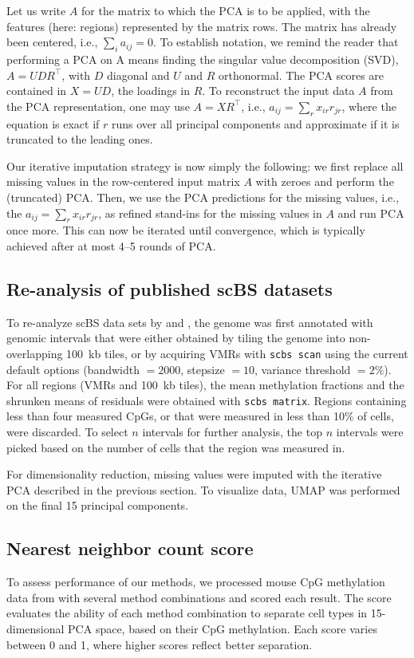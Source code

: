 \documentclass[twocolumn,10pt]{article}
\begin{document}
Let us write $A$ for the matrix to which the PCA is to be applied, with the features (here: regions) represented by the matrix rows.
The matrix has already been centered, i.e., $\sum_i a_{ij}=0$.
To establish notation, we remind the reader that performing a PCA on A means finding the singular value decomposition (SVD), $A=UDR^\top$, with $D$ diagonal and $U$ and $R$ orthonormal.
The PCA scores are contained in $X=UD$, the loadings in $R$.
To reconstruct the input data $A$ from the PCA representation, one may use $A=XR^\top$, i.e., $a_{ij}=\sum_r x_{ir} r_{jr}$, where the equation is exact if $r$ runs over all principal components and approximate if it is truncated to the leading ones.

Our iterative imputation strategy is now simply the following: we first replace all missing values in the row-centered input matrix $A$ with zeroes and perform the (truncated) PCA.
Then, we use the PCA predictions for the missing values, i.e., the $a_{ij}=\sum_r x_{ir} r_{jr}$, as refined stand-ins for the missing values in $A$ and run PCA once more.
This can now be iterated until convergence, which is typically achieved after at most 4--5 rounds of PCA.

\subsection{Re-analysis of published scBS datasets}
To re-analyze scBS data sets by \citet{luo2017single} and \citet{argelaguet2019gastru}, the genome was first annotated with genomic intervals that were either obtained by tiling the genome into non-overlapping 100~kb tiles, or by acquiring VMRs with \texttt{scbs scan} using the current default options (bandwidth $=2000$, stepsize $=10$, variance threshold $= 2\%$).
For all regions (VMRs and 100~kb tiles), the mean methylation fractions and the shrunken means of residuals were obtained with \texttt{scbs matrix}.
Regions containing less than four measured CpGs, or that were measured in less than 10\% of cells, were discarded.
To select $n$ intervals for further analysis, the top $n$ intervals were picked based on the number of cells that the region was measured in.

For dimensionality reduction, missing values were imputed with the iterative PCA described in the previous section.
To visualize data, UMAP was performed on the final 15 principal components.

\subsection{Nearest neighbor count score}
To assess performance of our methods, we processed mouse CpG methylation data from \citet{luo2017single} with several method combinations and scored each result.
The score evaluates the ability of each method combination to separate cell types in 15-dimensional PCA space, based on their CpG methylation.
Each score varies between 0 and 1, where higher scores reflect better separation.
\end{document}
